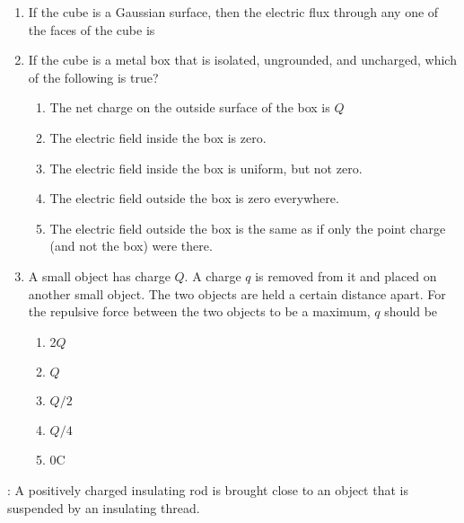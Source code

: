 \documentclass[10pt]{article}
\begin{document}
\begin{enumerate}[resume, itemsep = 5mm]
  \item
    If the cube is a Gaussian surface, then the electric flux
    through any one of the faces of the cube is
  \item If the cube is a metal box that is isolated, ungrounded, and
    uncharged, which of the following is true?
    \begin{enumerate}
      \item The net charge on the outside surface of the box is $Q$
      \item The electric field inside the box is zero.
      \item The electric field inside the box is uniform, but not
        zero.
      \item The electric field outside the box is zero everywhere.
      \item The electric field outside the box is the same as if only
        the point charge (and not the box) were there.
    \end{enumerate}
  \item A small object has charge $Q$.  A charge $q$ is removed from
    it and placed on another small object.  The two objects are held a
    certain distance apart.  For the repulsive force between the two
    objects to be a maximum, $q$ should be
    \begin{enumerate}
      \item 2$Q$
      \item $Q$
      \item $Q/2$
      \item $Q/4$
      \item 0\si{\coulomb}
    \end{enumerate}
\end{enumerate}

: A positively charged insulating rod is
brought close to an object that is suspended by an insulating thread.
\end{document}
